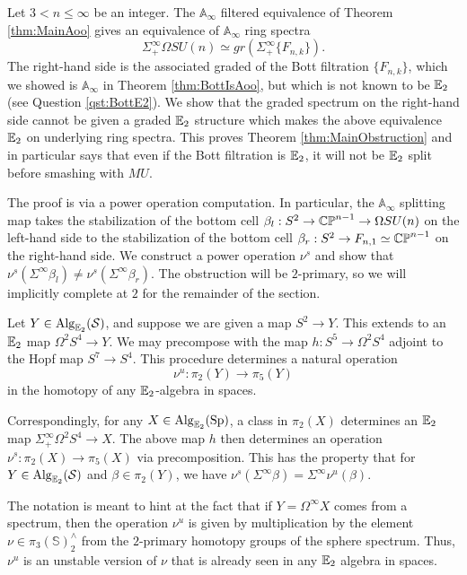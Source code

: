 

Let $3< n\leq \infty$ be an integer.  The $\mathbb{A}_{\infty}$ filtered equivalence of Theorem \ref{thm:MainAoo} gives an equivalence of $\mathbb{A}_\infty$ ring spectra  $$\Sigma^{\infty}_+ \Omega SU(n) \simeq gr(\Sigma^{\infty}_+ \{ F_{n,k} \}).$$  The right-hand side is the associated graded of the Bott filtration $\{ F_{n,k} \}$, which we showed is $\mathbb{A}_\infty$ in Theorem \ref{thm:BottIsAoo}, but which is not known to be $\operatorname{\mathbb{E}}_2$ (see Question \ref{qst:BottE2}).  We show that the graded spectrum on the right-hand side cannot be given a graded $\operatorname{\mathbb{E}}_2$ structure which makes the above equivalence $\operatorname{\mathbb{E}}_2$ on underlying ring spectra.  This proves Theorem \ref{thm:MainObstruction} and in particular says that even if the Bott filtration is $\operatorname{\mathbb{E}}_2$, it will not be $\operatorname{\mathbb{E}}_2$ split before smashing with $MU$.

The proof is via a power operation computation.  In particular, the $\mathbb{A}_\infty$ splitting map takes the stabilization of the bottom cell $\beta_l : S^2 \to  \operatorname{\mathbb{CP}}^{n-1} \to \Omega SU(n)$ on the left-hand side to the stabilization of the bottom cell $\beta_r: S^2 \to F_{n,1} \simeq \operatorname{\mathbb{CP}}^{n-1}$ on the right-hand side.  We construct a power operation $\nu^{s}$ and show that $\nu^{s}(\Sigma^{\infty} \beta_l) \neq \nu^s(\Sigma^{\infty} \beta_r).$  The obstruction will be $2$-primary, so we will implicitly complete at $2$ for the remainder of the section.  

\begin{obs}Let $Y\in \operatorname{\mathrm{Alg}}_{\operatorname{\mathbb{E}}_2}(\operatorname{\mathcal{S}})$, and suppose we are given a map $S^2\to Y$.  This extends to an $\operatorname{\mathbb{E}}_2$ map $\Omega^2 S^4 \to Y.$  We may precompose with the map $h: S^5 \to \Omega^2 S^4$ adjoint to the Hopf map $S^7\to S^4$.  This procedure determines a natural operation $$\nu^u: \pi_2(Y) \to \pi_5(Y)$$ in the homotopy of any $\operatorname{\mathbb{E}}_2$-algebra in spaces.  

Correspondingly, for any $X\in \operatorname{\mathrm{Alg}}_{\operatorname{\mathbb{E}}_2}(\operatorname{\mathrm{Sp}})$, a class in $\pi_2(X)$ determines an $\operatorname{\mathbb{E}}_2$ map $\Sigma^{\infty}_+ \Omega^2 S^4 \to X$.  The above map $h$ then determines an operation $\nu^s :\pi_2(X) \to \pi_5(X)$ via precomposition.  This has the property that for $Y\in \operatorname{\mathrm{Alg}}_{\operatorname{\mathbb{E}}_2}(\operatorname{\mathcal{S}})$ and $\beta \in \pi_2(Y)$, we have $\nu^s(\Sigma^{\infty} \beta) = \Sigma^{\infty} \nu^u (\beta).$
\end{obs}

\begin{rmk} \label{rmk:multnu}
The notation is meant to hint at the fact that if $Y = \Omega^\infty X$ comes from a spectrum, then the operation $\nu^u$ is given by multiplication by the element $\nu \in \pi_3(\mathbb{S})^{\wedge}_2$ from the $2$-primary homotopy groups of the sphere spectrum.  Thus, $\nu^u$ is an unstable version of $\nu$ that is already seen in any $\operatorname{\mathbb{E}}_2$ algebra in spaces.    %
\end{rmk}

